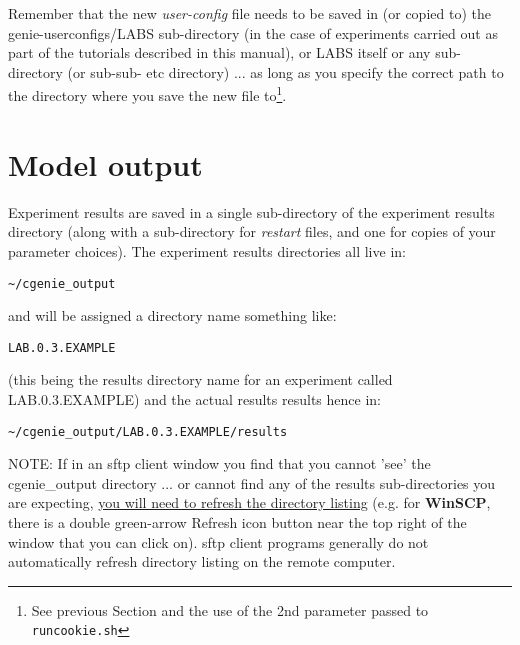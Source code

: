 \noindent Remember that the new \textit{user-config} file needs to be saved in (or copied to) the \textsf{\footnotesize genie-userconfigs/LABS} sub-directory (in the case of experiments carried out as part of the tutorials described in this manual), or \textsf{\footnotesize LABS} itself or any sub-directory (or sub-sub- etc directory) ... as long as you specify the correct path to the directory where you save the new file to\footnote{See previous Section and the use of the 2nd parameter passed to \texttt{runcookie.sh}}.

\newpage

\section{Model output}

Experiment results are saved in a single sub-directory of the experiment results directory (along with a sub-directory for \textit{restart} files, and one for copies of your parameter choices). The experiment results directories all live in:

\vspace{-1mm}\begin{verbatim}
~/cgenie_output
\end{verbatim}\vspace{-1mm}
and will be assigned a directory name something like:

\vspace{-1mm}\begin{verbatim}
LAB.0.3.EXAMPLE
\end{verbatim}\vspace{-1mm}
(this being the results directory name for an experiment called \textsf{\footnotesize LAB.0.3.EXAMPLE}) and the actual results results hence in:

\vspace{-1mm}\begin{verbatim}
~/cgenie_output/LAB.0.3.EXAMPLE/results
\end{verbatim}\vspace{-1mm}

\noindent NOTE: If in an sftp client window you find that you cannot 'see' the \textsf{\footnotesize cgenie\_output} directory ... or cannot find any of the results sub-directories you are expecting, \uline{you will need to refresh the directory listing} (e.g. for \textbf{WinSCP}, there is a double green-arrow \textsf{\footnotesize Refresh} icon button near the top right of the window that you can click on). sftp client programs generally do not automatically refresh directory listing on the remote computer.

